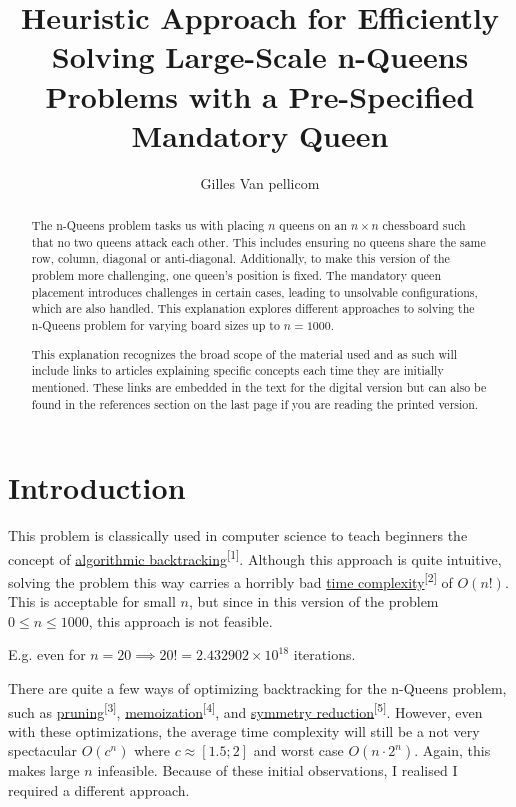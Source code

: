 \documentclass{article}
\title{Heuristic Approach for Efficiently Solving Large-Scale n-Queens Problems with a Pre-Specified Mandatory Queen}
\author{Gilles Van pellicom}
\begin{document}
\maketitle

\begin{abstract}
    \setlength{\parindent}{0pt}
    \setlength{\parskip}{1em}
    The n-Queens problem tasks us with placing \(n\) queens on an \(n \times n\) chessboard such that no two queens attack each other.
    This includes ensuring no queens share the same row, column, diagonal or anti-diagonal. Additionally, to make this version of the problem more challenging,
    one queen's position is fixed.
    The mandatory queen placement introduces challenges in certain cases, leading to unsolvable configurations, which are also handled.
    This explanation explores different approaches to solving the n-Queens problem for varying board sizes up to \(n = 1000\).

    This explanation recognizes the broad scope of the material used and as such will include links to articles explaining specific concepts
    each time they are initially mentioned.
    These links are embedded in the text for the digital version but can also be found in the references section on the last page if you are reading the printed version.
\end{abstract}

\clearpage

{
    \hypersetup{linkcolor=black}
    \tableofcontents
}

\clearpage

\section{Introduction}
This problem is classically used in computer science to teach beginners the concept of
\href{https://en.wikipedia.org/wiki/Backtracking}{algorithmic backtracking}\textsuperscript{[1]}.
Although this approach is quite intuitive, solving the problem this way carries a horribly bad
\href{https://en.wikipedia.org/wiki/Time_complexity}{time complexity}\textsuperscript{[2]} of \(O(n!)\).
This is acceptable for small \(n\), but since in this version of the problem \(0 \leq n \leq 1000\), this approach is not feasible.

E.g. even for \(n = 20 \implies 20! = 2.432902 \times 10^{18}\) iterations.

There are quite a few ways of optimizing backtracking for the n-Queens problem, such as
\href{https://en.wikipedia.org/wiki/Decision_tree_pruning}{pruning}\textsuperscript{[3]},
\href{https://en.wikipedia.org/wiki/Memoization}{memoization}\textsuperscript{[4]}, and
\href{https://www.khoury.northeastern.edu/home/wahl/Publications/ew05b.pdf}{symmetry reduction}\textsuperscript{[5]}.
However, even with these optimizations, the average time complexity will still be a not very spectacular
\(O(c^n)\) where \(c \approx [1.5; 2]\) and worst case \(O(n \cdot 2^n)\). Again, this makes large \(n\) infeasible.
Because of these initial observations, I realised I required a different approach.
\end{document}
